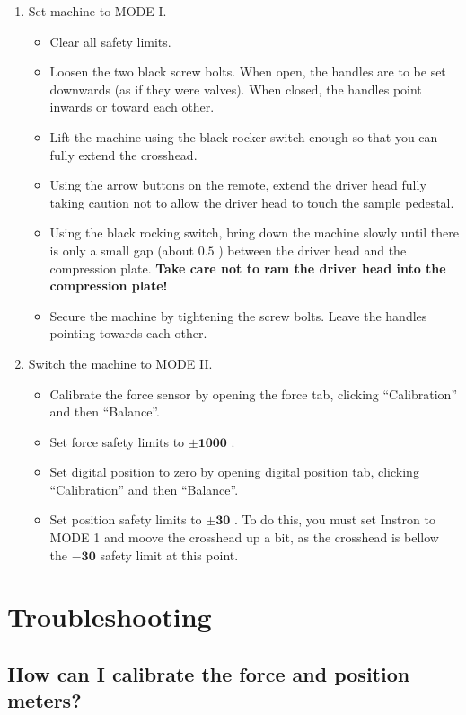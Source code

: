 \documentclass[a4paper]{article}
\begin{document}
\begin{enumerate}
  \item Set machine to \textsf{MODE I}.
  \begin{itemize}
    \item Clear all safety limits.
    \item Loosen the two black screw bolts. When open, the handles are to be set downwards (as if they were valves). When closed, the handles point inwards or toward each other.
    \item Lift the machine using the black rocker switch enough so that you can fully extend the crosshead.
    \item Using the arrow buttons on the remote, extend the driver head fully taking caution not to allow the driver head to touch the sample pedestal.
    \item Using the black rocking switch, bring down the machine slowly until there is only a small gap (about $0.5$ \milli\meter) between the driver head and the compression plate. {\bf Take care not to ram the driver head into the compression plate!}
    \item Secure the machine by tightening the screw bolts. Leave the handles pointing towards each other.
  \end{itemize}
  \item Switch the machine to \textsf{MODE II}.
  \begin{itemize}  
    \item Calibrate the force sensor by opening the force tab, clicking ``Calibration'' and then ``Balance''.
    \item Set force safety limits to $\mathbf{\pm 1000}$ {\bf\newton}.
    \item Set digital position to zero by opening digital position tab, clicking ``Calibration'' and then ``Balance''.
    \item Set position safety limits to $\mathbf{\pm 30}$ {\bf\milli\meter}. To do this, you must set Instron to \textsf{MODE 1} and moove the crosshead up a bit, as the crosshead is bellow the $\mathbf{-30}$ {\bf\milli\meter} safety limit at this point.
  \end{itemize}
\end{enumerate}

\section{Troubleshooting}

\subsection{How can I calibrate the force and position meters?}
\end{document}
